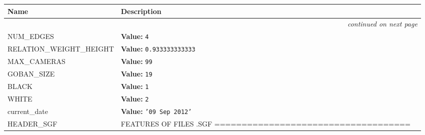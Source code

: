     \vspace{-1cm}
\hspace{\varindent}\begin{longtable}{|p{\varnamewidth}|p{\vardescrwidth}|l}
\cline{1-2}
\cline{1-2} \centering \textbf{Name} & \centering \textbf{Description}& \\
\cline{1-2}
\endhead\cline{1-2}\multicolumn{3}{r}{\small\textit{continued on next page}}\\\endfoot\cline{1-2}
\endlastfoot\raggedright N\-U\-M\-\_\-E\-D\-G\-E\-S\- & \raggedright \textbf{Value:} 
{\tt 4}&\\
\cline{1-2}
\raggedright R\-E\-L\-A\-T\-I\-O\-N\-\_\-W\-E\-I\-G\-H\-T\-\_\-H\-E\-I\-G\-H\-T\- & \raggedright \textbf{Value:} 
{\tt 0.933333333333}&\\
\cline{1-2}
\raggedright M\-A\-X\-\_\-C\-A\-M\-E\-R\-A\-S\- & \raggedright \textbf{Value:} 
{\tt 99}&\\
\cline{1-2}
\raggedright G\-O\-B\-A\-N\-\_\-S\-I\-Z\-E\- & \raggedright \textbf{Value:} 
{\tt 19}&\\
\cline{1-2}
\raggedright B\-L\-A\-C\-K\- & \raggedright \textbf{Value:} 
{\tt 1}&\\
\cline{1-2}
\raggedright W\-H\-I\-T\-E\- & \raggedright \textbf{Value:} 
{\tt 2}&\\
\cline{1-2}
\raggedright c\-u\-r\-r\-e\-n\-t\-\_\-d\-a\-t\-e\- & \raggedright \textbf{Value:} 
{\tt \texttt{'}\texttt{09 Sep 2012}\texttt{'}}&\\
\cline{1-2}
\raggedright H\-E\-A\-D\-E\-R\-\_\-S\-G\-F\- & \raggedright FEATURES OF FILES .SGF ====================================


\end{longtable}
